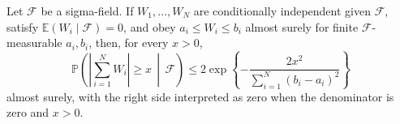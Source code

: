 Let \(\mathcal F\) be a sigma-field. If \(W_1,\ldots,W_N\) are conditionally independent given \(\mathcal F\), satisfy \(\mathbb E(W_i\mid\mathcal F)=0\), and obey \(a_i\le W_i\le b_i\) almost surely for finite \(\mathcal F\)-measurable \(a_i,b_i\), then, for every \(x>0\),
\[
\mathbb P\left(\left|\sum_{i=1}^N W_i\right|\ge x\,\middle|\,\mathcal F\right)
\le2\exp\left\{-\frac{2x^2}{\sum_{i=1}^N(b_i-a_i)^2}\right\}
\]
almost surely, with the right side interpreted as zero when the denominator is zero and \(x>0\).